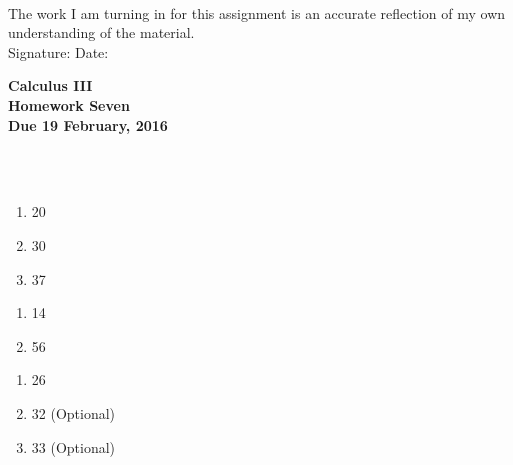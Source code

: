 \documentclass[12pt]{article}
\begin{document}
\\

\bigskip
\bigskip
\bigskip
\bigskip
\bigskip
\bigskip
\noindent The work I am turning in for this assignment is an accurate
reflection of my own understanding of the material.\\[14pt]

\noindent Signature: \underline{\hspace{7cm}} \hspace{1cm} Date:
\underline{\hspace{5cm}} 


\pagestyle{empty}
 
\begin{center}
{\large {\bf Calculus III}}\\
\medskip
{\large {\bf Homework Seven}}\\
\medskip
{ {\bf Due 19 February, 2016}}\\
\end{center}

\hspace{2mm}\\




\hspace{2mm}\\

\begin{enumerate}
\setlength{\itemsep}{-1mm}
  \item 20
  \item 30
  \item 37
\end{enumerate}

\begin{enumerate}
\setlength{\itemsep}{-1mm}
  \item 14
  \item 56
\end{enumerate}

\begin{enumerate}
\setlength{\itemsep}{-1mm}
  \item 26
  \item 32 (Optional)
  \item 33 (Optional)
\end{enumerate}


\end{document}
